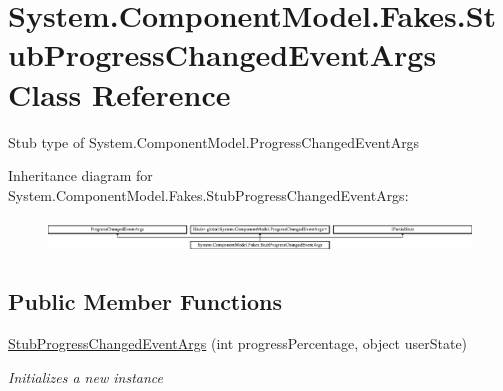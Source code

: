 \hypertarget{class_system_1_1_component_model_1_1_fakes_1_1_stub_progress_changed_event_args}{\section{System.\-Component\-Model.\-Fakes.\-Stub\-Progress\-Changed\-Event\-Args Class Reference}
\label{class_system_1_1_component_model_1_1_fakes_1_1_stub_progress_changed_event_args}
}


Stub type of System.\-Component\-Model.\-Progress\-Changed\-Event\-Args 


Inheritance diagram for System.\-Component\-Model.\-Fakes.\-Stub\-Progress\-Changed\-Event\-Args\-:\begin{figure}[H]
\begin{center}
\leavevmode
\includegraphics[height=0.895284cm]{class_system_1_1_component_model_1_1_fakes_1_1_stub_progress_changed_event_args}
\end{center}
\end{figure}
\subsection*{Public Member Functions}
\begin{DoxyCompactItemize}
\item 
\hyperlink{class_system_1_1_component_model_1_1_fakes_1_1_stub_progress_changed_event_args_a8979a407afbb7547a339c51e0473ff76}{Stub\-Progress\-Changed\-Event\-Args} (int progress\-Percentage, object user\-State)
\begin{DoxyCompactList}\small\item\em Initializes a new instance\end{DoxyCompactList}\end{DoxyCompactItemize}
